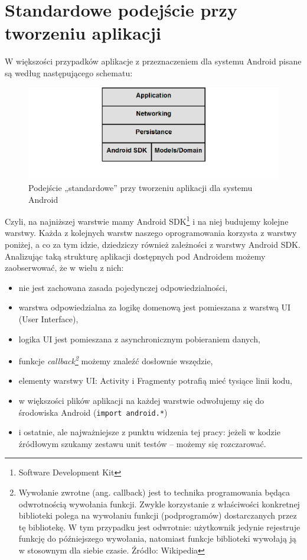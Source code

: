 \section{Standardowe podejście przy tworzeniu aplikacji}
W większości przypadków aplikacje z przeznaczeniem dla systemu Android pisane są według następującego schematu:

\begin{figure}[!htb]
    \centering
    \includegraphics[width=15cm]{imgs/ch3_opis_problemu_1.png}
    \caption
{Podejście „standardowe” przy tworzeniu aplikacji dla systemu Android}
    \label{fig:opis_problemu}
\end{figure} 

Czyli, na najniższej warstwie mamy Android SDK\footnote{Software Development Kit}  i na niej budujemy kolejne warstwy. Każda z kolejnych warstw naszego oprogramowania korzysta z warstwy poniżej, a co za tym idzie, dziedziczy również zależności z warstwy Android SDK. Analizując taką strukturę aplikacji dostępnych pod Androidem możemy zaobserwować, że w wielu z nich:
\begin{itemize}
\item
nie jest zachowana zasada pojedynczej odpowiedzialności,
\item
warstwa odpowiedzialna za logikę domenową jest pomieszana z warstwą UI (User Interface),
\item
logika UI jest pomieszana z asynchronicznym pobieraniem danych,
\item
funkcje \textit{callback\footnote{Wywołanie zwrotne (ang. callback) jest to technika programowania będąca odwrotnością wywołania funkcji. Zwykle korzystanie z właściwości konkretnej biblioteki polega na wywołaniu funkcji (podprogramów) dostarczanych przez tę bibliotekę. W tym przypadku jest odwrotnie: użytkownik jedynie rejestruje funkcję do późniejszego wywołania, natomiast funkcje biblioteki wywołają ją w stosownym dla siebie czasie. Źródło: Wikipedia}} możemy znaleźć dosłownie wszędzie,
\item
elementy warstwy UI: Activity i Fragmenty potrafią mieć tysiące linii kodu,
\item
w większości plików aplikacji na każdej warstwie odwołujemy się do środowiska Android (\texttt{import android.*})
\item
i ostatnie, ale najważniejsze z punktu widzenia tej pracy: jeżeli w kodzie źródłowym szukamy zestawu unit testów – możemy się rozczarować.
\end{itemize}

